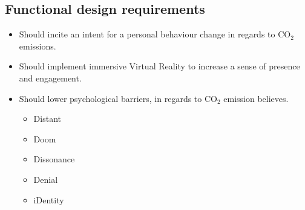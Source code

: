 \subsection{Functional design requirements}
\begin{itemize}
    \item Should incite an intent for a personal behaviour change in regards to CO$_2$ emissions.
    \item Should implement immersive Virtual Reality to increase a sense of presence and engagement.
    \item Should lower psychological barriers, in regards to CO$_2$ emission believes.\cite{the5Ds}
    \begin{itemize}
        \item Distant
        \item Doom
        \item Dissonance
        \item Denial
        \item iDentity
    \end{itemize}
\end{itemize}


